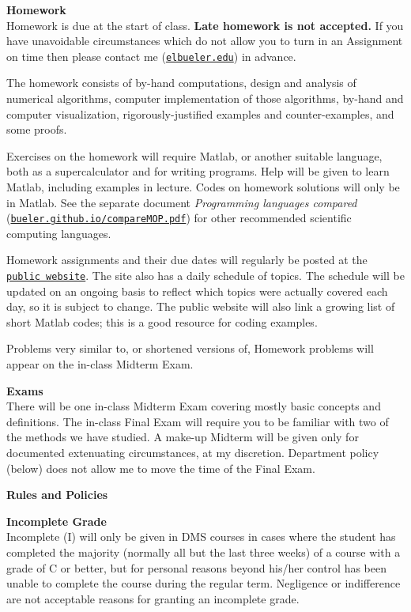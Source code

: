 \documentclass[12pt]{article}
\renewcommand{\emph}[1]{\textsf{\textbf{#1}}}
\newcommand{\localhead}[1]{\par\smallskip\textbf{#1} \smallskip\nobreak\\}%
\def\heading#1{\localhead{\large\emph{#1}}}
\def\subheading#1{\localhead{\emph{#1}}}
\begin{document}
\heading{Homework}
Homework is due at the start of class.  \emph{Late homework is not accepted.}  If you have unavoidable circumstances which do not allow you to turn in an Assignment on time then please contact me (\href{mailto:elbueler@alaska.edu}{\texttt{elbueler\@@alaska.edu}}) in advance.

The homework consists of by-hand computations, design and analysis of numerical algorithms, computer implementation of those algorithms, by-hand and computer visualization, rigorously-justified examples and counter-examples, and some proofs.

Exercises on the homework will require Matlab, or another suitable language, both as a supercalculator and for writing programs.  Help will be given to learn Matlab, including examples in lecture.  Codes on homework solutions will only be in Matlab.  See the separate document \textsl{Programming languages compared} (\href{https://bueler.github.io/compareMOP.pdf}{\texttt{bueler.github.io/compareMOP.pdf}}) for other recommended scientific computing languages.

Homework assignments and their due dates will regularly be posted at the \href{https://bueler.github.io/nade/}{\texttt{public website}}.  The site also has a daily schedule of topics.  The schedule will be updated on an ongoing basis to reflect which topics were actually covered each day, so it is subject to change.  The public website will also link a growing list of short Matlab codes; this is a good resource for coding examples.

Problems very similar to, or shortened versions of, Homework problems will appear on the in-class Midterm Exam.


\heading{Exams}
There will be one in-class Midterm Exam covering mostly basic concepts and definitions. The in-class Final Exam will require you to be familiar with two of the methods we have studied.  A make-up Midterm will be given only for documented extenuating circumstances, at my discretion.  Department policy (below) does not allow me to move the time of the Final Exam.


\heading{Rules and Policies}
\vskip -20pt

\subheading{Incomplete Grade} 
Incomplete (I) will only be given in
  DMS courses in cases where
  the student has completed the majority (normally all but the last
  three weeks) of a course with a grade of C or better, but for
  personal reasons beyond his/her control has been unable to complete
  the course during the regular term. Negligence or indifference are
  not acceptable reasons for granting an incomplete grade.
\end{document}
